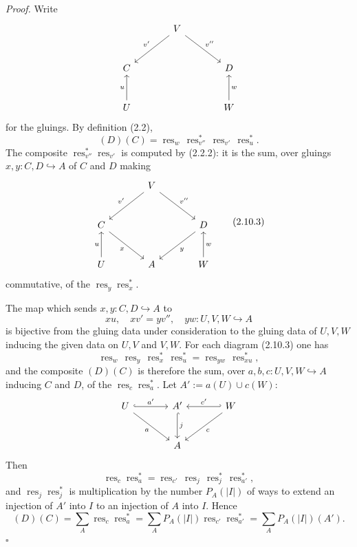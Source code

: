 \documentclass[11pt]{article}
\newcommand{\res}{\operatorname{res}}
\theoremstyle{deligne}
\newenvironment{proofdel}{\textit{Proof.}}{\hfill$\square$}
\begin{document}
\begin{proofdel}
Write
\[
\begin{tikzcd}[column sep=large,row sep=large]
& V \arrow[dl,"v'"'] \arrow[dr,"v''"] &\\
C && D\\
U \arrow[u,"u"] && W \arrow[u,"w"']
\end{tikzcd}
\]
for the gluings. By definition (2.2),
\[
  (D)(C)=\res_w\,\res_{v''}^*\,\res_{v'}\,\res_u^*.
\]
The composite \(\res_{v''}^*\res_{v'}\) is computed by (2.2.2): it is the sum, over gluings \(x,y:C,D\hookrightarrow A\) of \(C\) and \(D\) making
\[
\begin{tikzcd}[column sep=large,row sep=large]
& V \arrow[dl,"v'"'] \arrow[dr,"v''"] &\\
C \arrow[dr,"x"'] && D \arrow[dl,"y"]\\
U \arrow[u,"u"] & A & W \arrow[u,"w"']
\end{tikzcd}
\tag{2.10.3}
\]
commutative, of the \(\res_y\res_x^*\).

The map which sends \(x,y:C,D\hookrightarrow A\) to
\[
  xu,\quad xv'=yv'',\quad yw:U,V,W\hookrightarrow A
\]
is bijective from the gluing data under consideration to the gluing data of \(U,V,W\) inducing the given data on \(U,V\) and \(V,W\). For each diagram (2.10.3) one has
\[
  \res_w\,\res_y\,\res_x^*\,\res_u^*=\res_{yw}\,\res_{xu}^*,
\]
and the composite \((D)(C)\) is therefore the sum, over \(a,b,c:U,V,W\hookrightarrow A\) inducing \(C\) and \(D\), of the \(\res_c\res_a^*\). Let \(A':=a(U)\cup c(W)\):
\[
\begin{tikzcd}[column sep=large,row sep=large]
U \arrow[r,hook,"a'"] \arrow[dr,"a"'] &
A' \arrow[d,hook,"j"] &
W \arrow[l,hook',"c'"'] \arrow[dl,"c"]\\
& A &
\end{tikzcd}
\]
Then
\[
  \res_c\res_a^*=\res_{c'}\,\res_j\,\res_j^*\,\res_{a'}^*,
\]
and \(\res_j\res_j^*\) is multiplication by the number \(P_A(|I|)\) of ways to extend an injection of \(A'\) into \(I\) to an injection of \(A\) into \(I\). Hence
\[
  (D)(C)=\sum_A\res_c\res_a^*
  =
  \sum_A P_A(|I|)\res_{c'}\res_{a'}^*
  =
  \sum_A P_A(|I|)(A').
\]
\end{proofdel}
\end{document}
